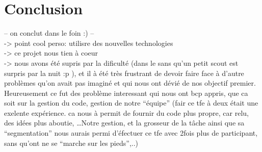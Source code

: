 \section{Conclusion}

-- on conclut dans le foin :) --\\

->  point cool perso: utilisre des nouvelles technologies \\

->  ce projet nous tien à coeur \\

-> nous avons été supris par la dificulté (dans le sans qu'un petit scout est
surpris par la nuit :p ), et il à été très frustrant de devoir faire face à
d'autre problèmes qu'on avait pas imaginé et qui nous ont dévié de nos objectif
premier.  Heureusement ce fut des problème interessant qui nous ont bcp appris,
que ca soit sur la gestion du code, gestion de notre ``équipe'' (fair ce tfe à
deux était une exelente expérience. ca nous à permit de fournir du code plus
propre, car relu, des idées plus aboutie, \ldots Notre gestion, et la grosseur
de la tâche ainsi que sa ``segmentation'' nous aurais permi d'éfectuer ce tfe
avec 2fois plus de participant, sans qu'ont ne se ``marche sur les pieds'',..)
